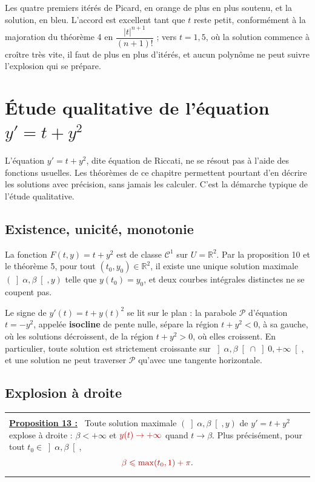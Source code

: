 \documentclass[a4paper,twoside]{report}
\makeatletter
\newcommand{\mot}[1]{\textcolor{rougecours}{\textbf{#1}}}
\newcommand{\rmath}[1]{\textcolor{rougecours}{#1}}
\newenvironment{cadre}%
 {\par\vspace{2mm}\noindent\begin{tabular}{|@{\hspace{4mm}}p{0.93\textwidth}@{\hspace{4mm}}|}
  \hline \\[-2mm]}%
 {\\[2mm] \hline \end{tabular}\par\vspace{3mm}}
\newcommand{\propo}[1]{\textbf{\underline{Proposition #1 :}}~}
\newcommand{\R}{\mathbb{R}}
\newcommand{\Cc}{\mathcal{C}}                     %
\makeatother
\begin{document}
\noindent Les quatre premiers itérés de Picard, en orange de plus en plus soutenu, et la solution, en bleu. L'accord est excellent tant que $t$ reste petit, conformément à la majoration du théorème 4 en $\dfrac{|t|^{n + 1}}{(n + 1)!}$ ; vers $t = 1{,}5$, où la solution commence à croître très vite, il faut de plus en plus d'itérés, et aucun polynôme ne peut suivre l'explosion qui se prépare.
\section[Étude qualitative]{Étude qualitative de l'équation $y' = t + y^{2}$}

L'équation $y' = t + y^{2}$, dite équation de Riccati, ne se résout pas à l'aide des fonctions usuelles. Les théorèmes de ce chapitre permettent pourtant d'en décrire les solutions avec précision, sans jamais les calculer. C'est la démarche typique de l'étude qualitative.

\subsection{Existence, unicité, monotonie}

La fonction $F(t, y) = t + y^{2}$ est de classe $\Cc^{1}$ sur $U = \R^{2}$. Par la proposition 10 et le théorème 5, pour tout $(t_{0}, y_{0}) \in \R^{2}$, il existe une unique solution maximale $(\left]\alpha, \beta\right[, y)$ telle que $y(t_{0}) = y_{0}$, et deux courbes intégrales distinctes ne se coupent pas.

Le signe de $y'(t) = t + y(t)^{2}$ se lit sur le plan : la parabole $\mathcal{P}$ d'équation $t = -y^{2}$, appelée \mot{isocline} de pente nulle, sépare la région $t + y^{2} < 0$, à sa gauche, où les solutions décroissent, de la région $t + y^{2} > 0$, où elles croissent. En particulier, toute solution est strictement croissante sur $\left]\alpha, \beta\right[ \cap \left]0, +\infty\right[$, et une solution ne peut traverser $\mathcal{P}$ qu'avec une tangente horizontale.

\subsection{Explosion à droite}

\begin{cadre}
\propo{13} Toute solution maximale $(\left]\alpha, \beta\right[, y)$ de $y' = t + y^{2}$ explose à droite : $\beta < +\infty$ et $\rmath{y(t) \to +\infty}$ quand $t \to \beta$. Plus précisément, pour tout $t_{0} \in \left]\alpha, \beta\right[$,
\[ \rmath{\beta \leqslant \max(t_{0}, 1) + \pi}. \]
\end{cadre}
\end{document}
